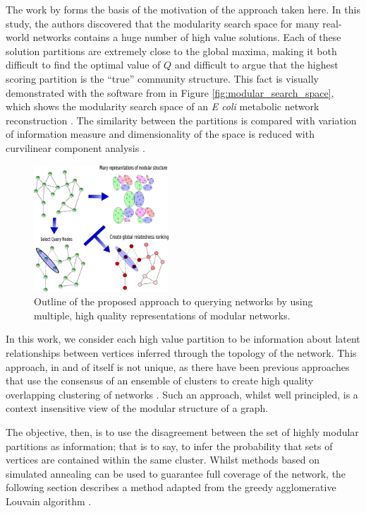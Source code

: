 \documentclass[sigconf]{acmart}
\begin{document}
The work by \cite{good2010performance} forms the basis of the motivation of the approach taken here.
In this study, the authors discovered that the modularity search space for many real-world networks contains a huge number of high value solutions.
Each of these solution partitions are extremely close to the global maxima, making it both difficult to find the optimal value of $Q$ and difficult to argue that the highest scoring partition is the ``true'' community structure.
This fact is visually demonstrated with the software from \cite{good2010performance} in Figure \ref{fig:modular_search_space}, which shows the modularity search space of an \textit{E coli} metabolic network reconstruction \cite{GuimeraNature2005}.
The similarity between the partitions is compared with variation of information measure \cite{meilua2003comparing} and dimensionality of the space is reduced with curvilinear component analysis \cite{demartines1997curvilinear}.

\begin{figure}[t]
    \centering
    \includegraphics[width=0.45\textwidth]{images/meth_fig/fig1_desc.eps}
    \caption{Outline of the proposed approach to querying networks by using multiple, high quality representations of modular networks.}
    \label{fig:algorithm_outline}
\end{figure}

In this work, we consider each high value partition to be information about latent relationships between vertices inferred through the topology of the network.
This approach, in and of itself is not unique, as there have been previous approaches that use the consensus of an ensemble of clusters to create high quality overlapping clustering of networks \cite{lancichinetti2012consensus}.
Such an approach, whilst well principled, is a context insensitive view of the modular structure of a graph.

The objective, then, is to use the disagreement between the set of highly modular partitions as information; that is to say, to infer the probability that sets of vertices are contained within the same cluster.
Whilst methods based on simulated annealing can be used to guarantee full coverage of the network, the following section describes a method adapted from the greedy agglomerative Louvain algorithm \cite{blondel2008fast}.
\end{document}
